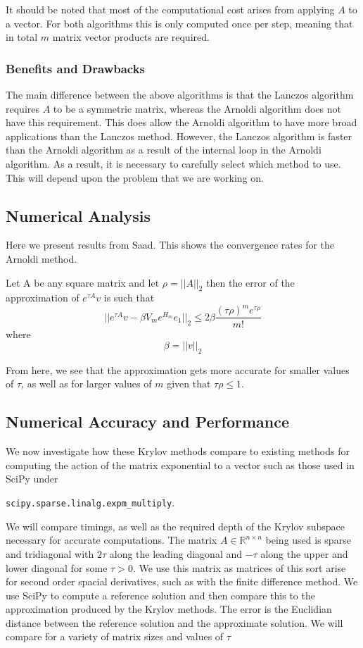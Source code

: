It should be noted that most of the computational cost arises from applying $A$ to a vector.
For both algorithms this is only computed once per step, meaning that in total $m$ matrix vector products are required.
\subsubsection{Benefits and Drawbacks}
The main difference between the above algorithms is that the Lanczos algorithm requires $A$ to be a symmetric matrix, whereas the Arnoldi algorithm does not have this requirement.
This does allow the Arnoldi algorithm to have more broad applications than the Lanczos method.
However, the Lanczos algorithm is faster than the Arnoldi algorithm as a result of the internal loop in the Arnoldi algorithm.
As a result, it is necessary to carefully select which method to use.
This will depend upon the problem that we are working on.

\subsection{Numerical Analysis}
Here we present results from Saad\cite{Saad1992}. This shows the convergence rates for the Arnoldi method.

\begin{theorem}
    Let A be any square matrix and let \(\rho=||A||_2\) then the error of the approximation of \(e^{\tau A}v\) is such that
    \[ ||e^{\tau A}v - \beta V_m e^{H_m}e_1||_2 \leq 2\beta \frac{(\tau \rho)^m e^{\tau \rho}}{m!} \] where \[\beta = ||v||_2\]
\end{theorem}
From here, we see that the approximation gets more accurate for smaller values of $\tau$, as well as for larger values of $m$ given that $\tau \rho\leq1$.

\subsection{Numerical Accuracy and Performance}
We now investigate how these Krylov methods compare to existing methods for computing the action of the matrix exponential to a vector such as those used in SciPy under 

\verb|scipy.sparse.linalg.expm_multiply|\cite{AlMohy2011}\cite{Higham2010}.

We will compare timings, as well as the required depth of the Krylov subspace necessary for accurate computations.
The matrix $A \in \mathbb{R}^{n \times n}$ being used is sparse and tridiagonal with $2\tau$ along the leading diagonal and $-\tau$ along the upper and lower diagonal for some $\tau > 0$.
We use this matrix as matrices of this sort arise for second order spacial derivatives, such as with the finite difference method.
We use SciPy to compute a reference solution and then compare this to the approximation produced by the Krylov methods.
The error is the Euclidian distance between the reference solution and the approximate solution.
We will compare for a variety of matrix sizes and values of $\tau$

